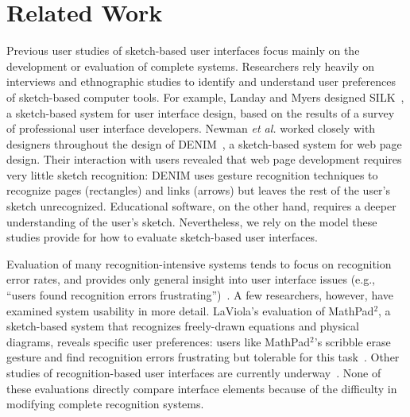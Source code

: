 \documentclass{egpubl}
\begin{document}


\section{Related Work}

Previous user studies of sketch-based user interfaces focus mainly on
the development or evaluation of complete systems.  Researchers rely
heavily on interviews and ethnographic studies to identify and understand
user preferences of sketch-based computer tools.  For example,
Landay and Myers designed SILK~\cite{landay95SILK}, a sketch-based
system for user interface design, based on the results of a survey of
professional user interface developers.  Newman \textit{et al.} worked
closely with designers throughout the design of
DENIM~\cite{Newman2003Denim}, a sketch-based system for web page
design.  Their interaction with users revealed that web page
development requires very little sketch recognition: DENIM uses
gesture recognition techniques to recognize pages (rectangles) and
links (arrows) but leaves the rest of the user's sketch unrecognized.
Educational software, on the other hand, requires a deeper
understanding of the user's sketch.  Nevertheless, we rely on the
model these studies provide for how to evaluate sketch-based user
interfaces.

Evaluation of many recognition-intensive systems tends to focus on
recognition error rates, and provides only general insight into user
interface issues (e.g., ``users found recognition errors
frustrating'')~\cite{Alvarado2001Preserving,Gennari2005Combining,Hammond2002Tahuti}.
A few researchers, however, have examined system usability in more
detail.  LaViola's evaluation of MathPad$^{2}$, a sketch-based system
that recognizes freely-drawn equations and physical diagrams, reveals
specific user preferences: users like MathPad$^{2}$'s scribble erase
gesture and find recognition errors frustrating but tolerable for this
task~\cite{LaViola2006Initial}.  Other studies of recognition-based
user interfaces are currently
underway~\cite{Koile2007Supporting,Tenneson2005ChemPad}.  None of
these evaluations directly compare interface elements because of the
difficulty in modifying complete recognition systems.
\end{document}
